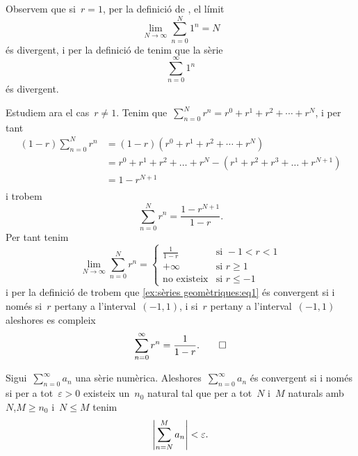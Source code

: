 \documentclass[../../main.tex]{subfiles}
\begin{document}
    \begin{solution}
        Observem que si~\(r=1\), per la definició de , el límit
        \[
            \lim_{N\to\infty}\sum_{n=0}^{N}1^{n}=N
        \]
        és divergent, i per la definició de  tenim que la sèrie
        \[
            \sum_{n=0}^{\infty}1^{n}
        \]
        és divergent.

        Estudiem ara el cas~\(r\neq1\).
        Tenim que~\(\sum_{n=0}^{N}r^{n}=r^{0}+r^{1}+r^{2}+\cdots+r^{N}\), i per tant
        \begin{align*}
            (1-r)\sum_{n=0}^{N}r^{n}&=(1-r)(r^{0}+r^{1}+r^{2}+\cdots+r^{N})\\
            &=r^{0}+r^{1}+r^{2}+\dots+r^{N}-(r^{1}+r^{2}+r^{3}+\dots+r^{N+1})\\
            &=1-r^{N+1}\\
        \end{align*}
        i trobem
        \begin{equation*}
            \sum_{n=0}^{N}r^{n}=\frac{1-r^{N+1}}{1-r}.
        \end{equation*}
        Per tant tenim
        \[\lim_{N\to\infty}\sum_{n=0}^{N}r^{n}=
        \begin{cases}
            \displaystyle \frac{1}{1-r} & \text{si }-1<r<1 \\
            +\infty & \text{si }r\geq1 \\
            \text{no existeix} & \text{si }r\leq-1
        \end{cases}\]
        i per la definició de  trobem que \eqref{ex:sèries geomètriques:eq1} és convergent si i només si~\(r\) pertany a l'interval~\((-1,1)\), i si~\(r\) pertany a l'interval~\((-1,1)\) aleshores es compleix
        \begin{equation*}
            \sum_{n=0}^{\infty}r^{n}=\frac{1}{1-r}.\qedhere
        \end{equation*}
    \end{solution}
    \begin{theorem}
        \label{thm:Condició de Cauchy per sèries numèriques}
        Sigui~\(\sum_{n=0}^{\infty}a_{n}\) una sèrie numèrica.
        Aleshores~\(\sum_{n=0}^{\infty}a_{n}\) és convergent si i només si per a tot~\(\varepsilon>0\) existeix un~\(n_{0}\) natural tal que per a tot~\(N\) i~\(M\) naturals amb~\(N\),\(M\geq n_{0}\) i~\(N\leq M\) tenim
        \[
            \abs{\sum_{n=N}^{M}a_{n}}<\varepsilon.
        \]
    \end{theorem}
\end{document}

